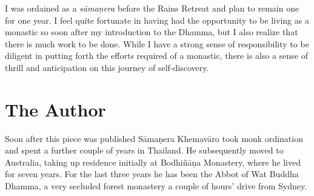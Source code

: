 I was ordained as a \emph{sāmaṇera} before the Rains Retreat and plan to
remain one for one year. I feel quite fortunate in having had the
opportunity to be living as a monastic so soon after my introduction to
the Dhamma, but I also realize that there is much work to be done. While
I have a strong sense of responsibility to be diligent in putting forth
the efforts required of a monastic, there is also a sense of thrill and
anticipation on this journey of self-discovery. 


\clearpage

\section{The Author}

Soon after this piece was published Sāmaṇera Khemavāro took monk
ordination and spent a further couple of years in Thailand. He
subsequently moved to Australia, taking up residence initially at
Bodhiñāṇa Monastery, where he lived for seven years. For the last three
years he has been the Abbot of Wat Buddha Dhamma, a very secluded forest
monastery a couple of hours' drive from Sydney.

